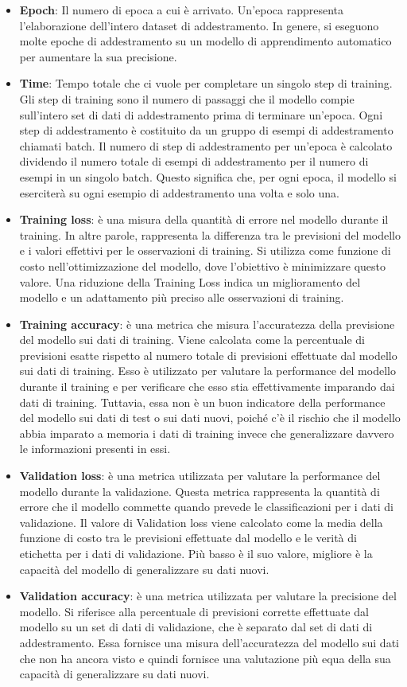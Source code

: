 \documentclass[a4paper,final,12pt]{report}
\begin{document}
\begin{itemize}
    \item \textbf{Epoch}: Il numero di epoca a cui è arrivato. Un'epoca rappresenta l'elaborazione dell'intero dataset di addestramento. In genere, si eseguono molte epoche di addestramento su un modello di apprendimento automatico per aumentare la sua precisione.
    \item \textbf{Time}: Tempo totale che ci vuole per completare un singolo step di training. Gli step di training sono il numero di passaggi che il modello compie sull'intero set di dati di addestramento prima di terminare un'epoca. Ogni step di addestramento è costituito da un gruppo di esempi di addestramento chiamati batch. Il numero di step di addestramento per un'epoca è calcolato dividendo il numero totale di esempi di addestramento per il numero di esempi in un singolo batch. Questo significa che, per ogni epoca, il modello si eserciterà su ogni esempio di addestramento una volta e solo una.
    \item \textbf{Training loss}: è una misura della quantità di errore nel modello durante il training. In altre parole, rappresenta la differenza tra le previsioni del modello e i valori effettivi per le osservazioni di training. Si utilizza come funzione di costo nell'ottimizzazione del modello, dove l'obiettivo è minimizzare questo valore. Una riduzione della Training Loss indica un miglioramento del modello e un adattamento più preciso alle osservazioni di training.
    \item \textbf{Training accuracy}: è una metrica che misura l'accuratezza della previsione del modello sui dati di training. Viene calcolata come la percentuale di previsioni esatte rispetto al numero totale di previsioni effettuate dal modello sui dati di training. Esso è utilizzato per valutare la performance del modello durante il training e per verificare che esso stia effettivamente imparando dai dati di training. Tuttavia, essa non è un buon indicatore della performance del modello sui dati di test o sui dati nuovi, poiché c'è il rischio che il modello abbia imparato a memoria i dati di training invece che generalizzare davvero le informazioni presenti in essi.
    \item \textbf{Validation loss}: è una metrica utilizzata per valutare la performance del modello durante la validazione. Questa metrica rappresenta la quantità di errore che il modello commette quando prevede le classificazioni per i dati di validazione. Il valore di Validation loss viene calcolato come la media della funzione di costo tra le previsioni effettuate dal modello e le verità di etichetta per i dati di validazione. Più basso è il suo valore, migliore è la capacità del modello di generalizzare su dati nuovi.
    \item \textbf{Validation accuracy}: è una metrica utilizzata per valutare la precisione del modello. Si riferisce alla percentuale di previsioni corrette effettuate dal modello su un set di dati di validazione, che è separato dal set di dati di addestramento. Essa fornisce una misura dell'accuratezza del modello sui dati che non ha ancora visto e quindi fornisce una valutazione più equa della sua capacità di generalizzare su dati nuovi.
\end{itemize}
\end{document}
